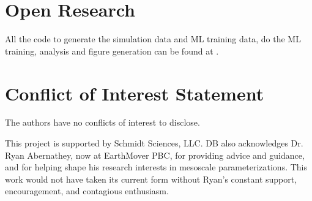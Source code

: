 \documentclass[draft]{agujournal2019}
\begin{document}




\section*{Open Research}
All the code to generate the simulation data and ML training data, do the ML training, analysis and figure generation can be found at . 

\section*{Conflict of Interest Statement}
The authors have no conflicts of interest to disclose.

\acknowledgments
This project is supported by Schmidt Sciences, LLC.
DB also acknowledges Dr. Ryan Abernathey, now at EarthMover PBC, 
for providing advice and guidance, and for helping shape his 
research interests in mesoscale parameterizations. This work 
would not have taken its current form without Ryan's constant 
support, encouragement, and contagious enthusiasm.
\end{document}
